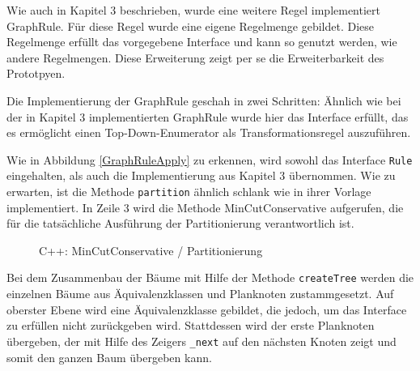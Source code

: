 Wie auch in Kapitel 3 beschrieben, wurde eine weitere Regel implementiert GraphRule. Für diese Regel wurde eine eigene Regelmenge gebildet. Diese Regelmenge erfüllt das vorgegebene Interface und kann so genutzt werden, wie andere Regelmengen. Diese Erweiterung zeigt per se die Erweiterbarkeit des Prototpyen.

Die Implementierung der GraphRule geschah in zwei Schritten: Ähnlich wie bei der in Kapitel 3 implementierten GraphRule wurde hier das Interface erfüllt, das es ermöglicht einen Top-Down-Enumerator als Transformationsregel auszuführen.




Wie in Abbildung \ref{GraphRuleApply} zu erkennen, wird sowohl das Interface \texttt{Rule} eingehalten, als auch die Implementierung aus Kapitel 3 übernommen. Wie zu erwarten, ist die Methode \texttt{partition} ähnlich schlank wie in ihrer Vorlage implementiert. In Zeile 3 wird die Methode MinCutConservative aufgerufen, die für die tatsächliche Ausführung der Partitionierung verantwortlich ist.



\begin{figure}[ht]

\caption{C++: MinCutConservative / Partitionierung}
\label{fig:MinCutConservative}
\end{figure}

Bei dem Zusammenbau der Bäume mit Hilfe der Methode \texttt{createTree} werden die einzelnen Bäume aus Äquivalenzklassen und Planknoten zustammgesetzt. Auf oberster Ebene wird eine Äquivalenzklasse gebildet, die jedoch, um das Interface zu erfüllen nicht zurückgeben wird. Stattdessen wird der erste Planknoten übergeben, der mit Hilfe des Zeigers \texttt{\_next} auf den nächsten Knoten zeigt und somit den ganzen Baum übergeben kann.